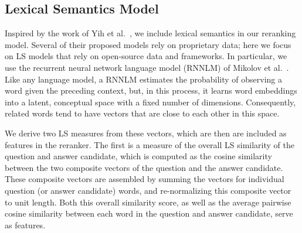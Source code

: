 \subsection{Lexical Semantics Model}
\label{sec:lexicalsemantics}

Inspired by the work of Yih et al.~, we include lexical semantics in our reranking model. 
Several of their proposed models rely on proprietary data; here we focus on LS models that rely on open-source data and frameworks. 
In particular, we use the recurrent neural network language model (RNNLM) of Mikolov et al.~.
Like any language model, a RNNLM estimates the probability of observing a word given the preceding context, but, in this process, it learns word embeddings into a latent, conceptual space with a fixed number of dimensions. 
Consequently, related words tend to have vectors that are close to each other in this space.

We derive two LS measures from these vectors, which are then are included as features in the reranker.  The first is a measure of the overall LS similarity of the question and answer candidate, which is computed as the cosine similarity between the two composite vectors of the question and the answer candidate.  These composite vectors are assembled by summing the vectors for individual question (or answer candidate) words, and re-normalizing this composite vector to unit length.  Both this overall similarity score, as well as the average pairwise cosine similarity between each word in the question and answer candidate, serve as features. 


%

